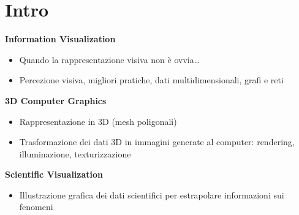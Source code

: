 \section{Intro}
\textbf{Information Visualization}
\begin{itemize}
    \item Quando la rappresentazione visiva non è ovvia…
    \item Percezione visiva, migliori pratiche, dati multidimensionali, grafi e reti
\end{itemize}

\textbf{3D Computer Graphics}
\begin{itemize}
    \item Rappresentazione in 3D (mesh poligonali)
    \item Trasformazione dei dati 3D in immagini generate al computer: rendering, illuminazione, texturizzazione
\end{itemize}

\textbf{Scientific Visualization}
\begin{itemize}
    \item Illustrazione grafica dei dati scientifici per estrapolare informazioni sui fenomeni
\end{itemize}

